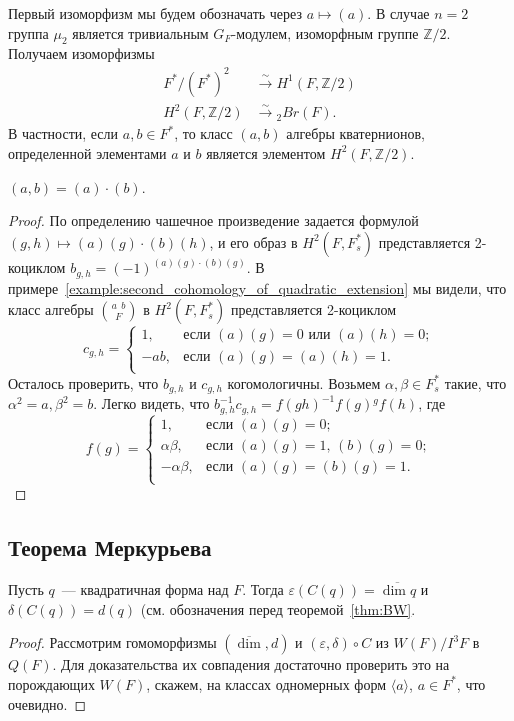 \documentclass[a4paper,oneside,12pt]{article}
\theoremstyle{plain} { \swapnumbers
\newtheorem{theorem}{Теорема}[subsection]
\newtheorem{corollary}[theorem]{Следствие}
\newtheorem{lemma}[theorem]{Лемма}
\newtheorem{proposition}[theorem]{Утверждение}
\newtheorem{claim}[theorem]{Факт}
}
\theoremstyle{definition} { \swapnumbers
\newtheorem{definition}[theorem]{Определение}
\newtheorem{notation}[theorem]{Обозначение}
\newtheorem{remark}[theorem]{Замечание}
\newtheorem{remarks}[theorem]{Замечания}
\newtheorem{example}[theorem]{Пример}
\newtheorem{examples}[theorem]{Примеры}
\newtheorem{sssection}[theorem]{}
}
\def\la{\langle}
\def\ra{\rangle}
\def\quaternion#1#2#3{\binom{{#1}\:\:{#2}}{#3}}
\begin{document}
Первый изоморфизм мы будем обозначать через $a\mapsto (a)$.
В случае $n=2$ группа $\mu_2$ является тривиальным $G_F$-модулем,
изоморфным группе $\mathbb Z/2$. Получаем изоморфизмы
$$
\begin{aligned}
F^*/(F^*)^2&\stackrel{\sim}{\to}H^1(F,\mathbb Z/2)\\
H^2(F,\mathbb Z/2)&\stackrel{\sim}{\to}{}_2Br(F).
\end{aligned}
$$
В частности, если $a,b\in F^*$, то класс $(a,b)$ алгебры кватернионов,
определенной элементами $a$ и $b$ является элементом $H^2(F,\mathbb Z/2)$.

\begin{proposition}\label{prop:cup_product}
$(a,b)=(a)\cdot(b)$.
\end{proposition}
\begin{proof}
По определению чашечное произведение задается формулой
$(g,h)\mapsto (a)(g)\cdot(b)(h)$, и его образ в $H^2(F,F_s^*)$ представляется 2-коциклом
$b_{g,h}=(-1)^{(a)(g)\cdot (b)(g)}$. В примере~\ref{example:second_cohomology_of_quadratic_extension}
мы видели, что класс алгебры $\quaternion{a}{b}{F}$ в $H^2(F,F_s^*)$ представляется
2-коциклом
$$
c_{g,h}=\begin{cases}
1,&\text{если $(a)(g)=0$ или $(a)(h)=0$};\\
-ab,&\text{если $(a)(g)=(a)(h)=1$}.\\
\end{cases}
$$
Осталось проверить, что $b_{g,h}$ и $c_{g,h}$ когомологичны.
Возьмем $\alpha,\beta\in F_s^*$ такие, что $\alpha^2=a,\beta^2=b$.
Легко видеть, что $b_{g,h}^{-1}c_{g,h}=f(gh)^{-1}f(g){}^gf(h)$, где
$$
f(g)=\begin{cases}
1,&\text{если $(a)(g)=0$};\\
\alpha\beta,&\text{если $(a)(g)=1$, $(b)(g)=0$};\\
-\alpha\beta,&\text{если $(a)(g)=(b)(g)=1$}.\\
\end{cases}
$$
\end{proof}

\subsection{Теорема Меркурьева}

\begin{proposition}\label{proposition:Merkurjev}
Пусть $q$~--- квадратичная форма над $F$. Тогда
$\varepsilon(C(q))=\overline{\dim q}$ и $\delta(C(q))=d(q)$
(см. обозначения перед теоремой~\ref{thm:BW}.
\end{proposition}
\begin{proof}
Рассмотрим гомоморфизмы $(\overline{\dim},d)$ и $(\varepsilon,\delta)\circ C$
из $W(F)/I^3F$ в $Q(F)$. Для доказательства их совпадения достаточно проверить это
на порождающих $W(F)$, скажем, на классах одномерных форм $\la a\ra$, $a\in F^*$,
что очевидно.
\end{proof}
\end{document}
